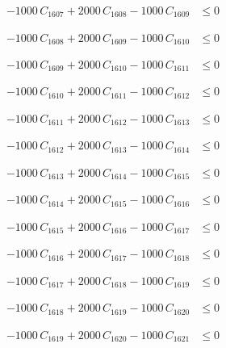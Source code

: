 \documentclass[a4paper,11pt]{article}
\begin{document}
\begin{align}
-1000\,C_{1607} + 2000\,C_{1608} - 1000\,C_{1609} &\leq 0 \nonumber
\end{align}

\begin{align}
-1000\,C_{1608} + 2000\,C_{1609} - 1000\,C_{1610} &\leq 0 \nonumber
\end{align}

\begin{align}
-1000\,C_{1609} + 2000\,C_{1610} - 1000\,C_{1611} &\leq 0 \nonumber
\end{align}

\begin{align}
-1000\,C_{1610} + 2000\,C_{1611} - 1000\,C_{1612} &\leq 0 \nonumber
\end{align}

\begin{align}
-1000\,C_{1611} + 2000\,C_{1612} - 1000\,C_{1613} &\leq 0 \nonumber
\end{align}

\begin{align}
-1000\,C_{1612} + 2000\,C_{1613} - 1000\,C_{1614} &\leq 0 \nonumber
\end{align}

\begin{align}
-1000\,C_{1613} + 2000\,C_{1614} - 1000\,C_{1615} &\leq 0 \nonumber
\end{align}

\begin{align}
-1000\,C_{1614} + 2000\,C_{1615} - 1000\,C_{1616} &\leq 0 \nonumber
\end{align}

\begin{align}
-1000\,C_{1615} + 2000\,C_{1616} - 1000\,C_{1617} &\leq 0 \nonumber
\end{align}

\begin{align}
-1000\,C_{1616} + 2000\,C_{1617} - 1000\,C_{1618} &\leq 0 \nonumber
\end{align}

\begin{align}
-1000\,C_{1617} + 2000\,C_{1618} - 1000\,C_{1619} &\leq 0 \nonumber
\end{align}

\begin{align}
-1000\,C_{1618} + 2000\,C_{1619} - 1000\,C_{1620} &\leq 0 \nonumber
\end{align}

\begin{align}
-1000\,C_{1619} + 2000\,C_{1620} - 1000\,C_{1621} &\leq 0 \nonumber
\end{align}
\end{document}
